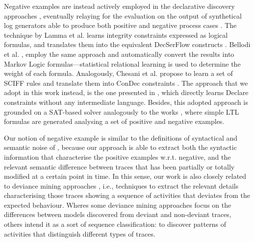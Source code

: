 Negative examples are instead actively employed in the declarative discovery approaches \cite{2007-Lamma,2009-Chesani,2010-Bellodi,2016-Bellodi,DBLP:conf/bpm/SlaatsDB21}, %
eventually relaying for the evaluation on the output of synthetical log generators able to produce both positive and negative process cases \cite{2009-Goedertier,2014-Stocker,2010-Hee,2019-Chesani,2017-Chesani,2020-Loreti}.
The technique by Lamma et al. \cite{2007-Lamma,2007b-Lamma} learns integrity constraints expressed as logical formulas, and translates them into the equivalent DecSerFlow constructs \cite{2006-Aalst}. 
Bellodi et al. \cite{2010-Bellodi}, \cite{2016-Bellodi} employ the same approach and automatically convert the results into Markov Logic formulas---statistical relational learning is used to determine the weight of each formula.
Analogously, Chesani et al. \cite{2009-Chesani} propose to learn a set of SCIFF rules \cite{2008-Alberti} and translate them into ConDec constraints \cite{2006-Pesic}. The approach that we adopt in this work instead, is the one presented in \cite{deviant-tkde}, which directly learns Declare constraints without any intermediate language.
Besides, this adopted approach is grounded on a SAT-based solver analogously to the works \cite{2018-Neider,2019-Camacho,2019-Riener}, where simple \ac{LTL} formulas are generated analysing a set of positive and negative examples.

Our notion of negative example is similar to the definitions of syntactical and semantic noise of \cite{2009-Gunther}, because our approach is able to extract both the syntactic information that characterise the positive examples w.r.t. negative, and the relevant semantic difference between traces that has been partially or totally modified at a certain point in time.
%
In this sense, our work is also closely related to deviance mining approaches \cite{2016-Nguyen}, i.e., techniques to extract the relevant details characterising those traces showing a sequence of activities that deviates from the expected behaviour. Wheres some deviance mining approaches \cite{2014-Suriadi,2014-Armas} focus on the differences between models discovered from deviant and non-deviant traces, others \cite{2013-Suriadi,2015-Partington,2013-Bose,2007-Lo,2016-Bernardi} intend it as a sort of sequence classification: to discover patterns of activities that distinguish different types of traces.

